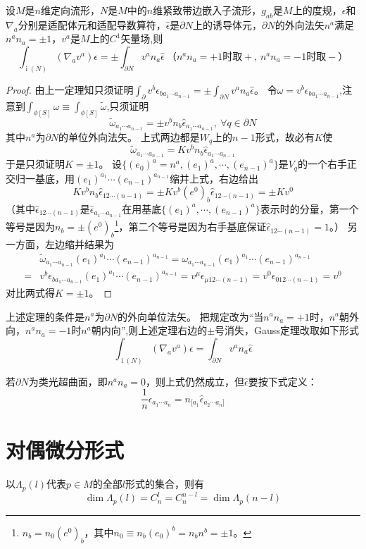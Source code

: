 \begin{theorem}
    设$M$是$n$维定向流形，$N$是$M$中的$n$维紧致带边嵌入子流形，$g_{ab}$是$M$上的度规，$\epsilon$和$\nabla_a$分别是适配体元和适配导数算符，$\hat\epsilon$是$\partial N$上的诱导体元，$\partial N$的外向法矢$n^a$满足$n^an_a = \pm 1$，$v^a$是$M$上的$C^1$矢量场,则
    $$\int_{\operatorname{i}(N)}(\nabla_av^a)\epsilon = \pm \int_{\partial N}v^an_a\hat\epsilon ~ \text{（$n^an_a = +1$时取$+$, $n^an_a = -1$时取$-$）}$$
\end{theorem}

\begin{proof}
    由上一定理知只须证明$\displaystyle\int_{\partial}v^b\epsilon_{ba_1 \cdots a_{n - 1}} = \pm \int_{\partial N}v^an_a\hat\epsilon$。
    令$\omega = v^b\epsilon_{ba_1 \cdots a_{n - 1}}$,注意到$\displaystyle\int_{\phi[S]}\omega \equiv \int_{\phi[S]}\tilde\omega$,只须证明
    $$\tilde\omega_{a_1 \cdots a_{n - 1}} = \pm v^bn_b\hat\epsilon_{a_1 \cdots a_{n - 1}}, ~ \forall q \in \partial N$$
    其中$n^a$为$\partial N$的单位外向法矢。
    上式两边都是$W_q$上的$n - 1$形式，故必有$K$使
    $$\tilde\omega_{a_1 \cdots a_{n - 1}} = K v^bn_b\hat\epsilon_{a_1 \cdots a_{n - 1}}$$
    于是只须证明$K = \pm 1$。
    设$\{(e_0)^a = n^a, (e_1)^a, \cdots, (e_{n - 1})^a\}$是$V_q$的一个右手正交归一基底，用$(e_1)^{a_1} \cdots (e_{n - 1})^{a_{n - 1}}$缩并上式，右边给出
    $$Kv^bn_b\hat\epsilon_{12\cdots(n - 1)} = \pm Kv^b(e^0)_b\hat\epsilon_{12\cdots(n - 1)} = \pm K v^0$$
    （其中$\hat\epsilon_{12\cdots(n - 1)}$是$\hat\epsilon_{a_1 \cdots a_{n - 1}}$在用基底$\{(e_1)^a, \cdots, (e_{n - 1})^a\}$表示时的分量，第一个等号是因为$n_b = \pm(e^0)_b$\footnote{
        $n_b = n_0(e^0)_b$，其中$n_0 \equiv n_b(e_0)^b = n_bn^b = \pm 1$。
    }，第二个等号是因为右手基底保证$\hat\epsilon_{12\cdots(n - 1)} = 1$。）
    另一方面，左边缩并结果为
    \[\begin{split}
        & \tilde\omega_{a_1 \cdots a_{n - 1}}(e_1)^{a_1} \cdots (e_{n - 1})^{a_{n - 1}} = \omega_{a_1 \cdots a_{n - 1}}(e_1)^{a_1} \cdots (e_{n - 1})^{a_{n - 1}} \\
        = & v^b\epsilon_{b a_1 \cdots a_{n - 1}}(e_1)^{a_1} \cdots (e_{n - 1})^{a_{n - 1}} = v^\mu\epsilon_{\mu 1 2 \cdots (n - 1)} = v^0\epsilon_{0 1 2 \cdots (n - 1)} = v^0
    \end{split}\]
    对比两式得$K = \pm 1$。
\end{proof}

\begin{note}
    上述定理的条件是$n^a$为$\partial N$的外向单位法矢。
    把规定改为``当$n^an_a = +1$时，$n^a$朝外向，$n^an_a = -1$时$n^a$朝内向'',则上述定理右边的$\pm$号消失，Gauss定理改取如下形式
    $$\int_{\operatorname{i}(N)}(\nabla_av^a)\epsilon = \int_{\partial N}v^an_a\hat\epsilon$$
    
    若$\partial N$为类光超曲面，即$n^an_a = 0$，则上式仍然成立，但$\hat\epsilon$要按下式定义：
    $$\frac{1}{n}\epsilon_{a_1 \cdots a_n} = n_{[a_1}\hat\epsilon_{a_2 \cdots a_n]}$$
\end{note}

\section{对偶微分形式}

以$\Lambda_p(l)$代表$p \in M$的全部$l$形式的集合，则有
$$\dim\Lambda_p(l) = C^l_n = C^{n - l}_n = \dim\Lambda_p(n - l)$$
